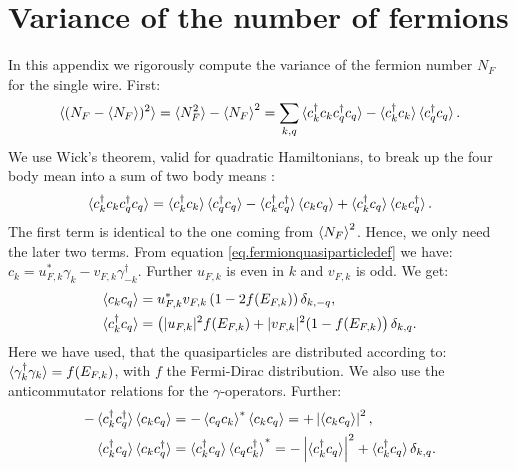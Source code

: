 
\chapter{Variance of the number of fermions} %

\label{Appendix.Fluctuationfermionnumber} %
\chead{}
In this appendix we rigorously compute the variance of the fermion number $N_F$ for the single wire. First:
\begin{equation}
\braket{(N_F-{\braket{N_F}})^2} = \braket{N_F^2} - \braket{N_F}^2 = \sum_{k,q} \braket{c^\dagger_kc_kc^\dagger_qc_q} - \braket{c^\dagger_kc_k}\braket{c^\dagger_qc_q}. \nonumber
\end{equation} 
We use Wick's theorem, valid for quadratic Hamiltonians, to break up the four body mean into a sum of two body means \cite[pp. 198-202]{BruusFlensberg}:
\begin{equation}
\braket{c^\dagger_kc_kc^\dagger_qc_q} = \braket{c^\dagger_kc_k}\braket{c^\dagger_qc_q} - \braket{c^\dagger_kc^\dagger_q}\braket{c_kc_q} + \braket{c^\dagger_kc_q}\braket{c_kc^\dagger_q}. \nonumber
\end{equation}
The first term is identical to the one coming from $\braket{N_F}^2$. Hence, we only need the later two terms. From equation \eqref{eq.fermionquasiparticledef} we have: $c_k = u^{*}_{F,k}\gamma_k - v_{F,k}\gamma^\dagger_{-k}$. Further $u_{F,k}$ is even in $k$ and $v_{F,k}$ is odd. We get:
\begin{align}
\braket{c_kc_q} &= u^{*}_{F,k}v_{F,k}\left(1 - 2f(E_{F,k})\right)\delta_{k,-q}, \nonumber \\
\braket{c^\dagger_kc_q} &= \left(|u_{F,k}|^2f(E_{F,k}) + |v_{F,k}|^2(1-f(E_{F,k})\right)\delta_{k,q}. \nonumber
\end{align}
Here we have used, that the quasiparticles are distributed according to: $\braket{\gamma^\dagger_k\gamma_k} = f(E_{F,k})$, with $f$ the Fermi-Dirac distribution. We also use the anticommutator relations for the $\gamma$-operators. Further:
\begin{align}
-\braket{c^\dagger_kc^\dagger_q}\braket{c_kc_q} &= -\braket{c_qc_k}^*\braket{c_kc_q} = +\left|\braket{c_kc_q}\right|^2, \nonumber \\
\braket{c^\dagger_kc_q}\braket{c_kc^\dagger_q} &= \braket{c^\dagger_kc_q}\braket{c_qc^\dagger_k}^* = -\left|\braket{c^\dagger_kc_q}\right|^2 + \braket{c^\dagger_k c_q}\delta_{k,q}. \nonumber
\end{align}
